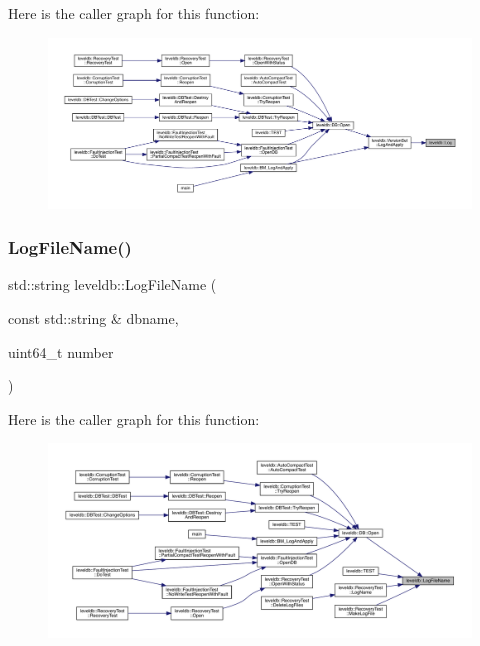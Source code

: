 Here is the caller graph for this function\+:
\nopagebreak
\begin{figure}[H]
\begin{center}
\leavevmode
\includegraphics[width=350pt]{namespaceleveldb_aeba9623ceee38be99bed2bc1ae082954_icgraph}
\end{center}
\end{figure}
\mbox{\label{namespaceleveldb_aba6dbc953c414e0069c35662ea806b9a}} 
\subsubsection{\texorpdfstring{LogFileName()}{LogFileName()}}
{\footnotesize\ttfamily std\+::string leveldb\+::\+Log\+File\+Name (\begin{DoxyParamCaption}\item[{const std\+::string \&}]{dbname,  }\item[{uint64\+\_\+t}]{number }\end{DoxyParamCaption})}

Here is the caller graph for this function\+:
\nopagebreak
\begin{figure}[H]
\begin{center}
\leavevmode
\includegraphics[width=350pt]{namespaceleveldb_aba6dbc953c414e0069c35662ea806b9a_icgraph}
\end{center}
\end{figure}
\mbox{\label{namespaceleveldb_a706c78e756ff2dcd2185cdf2265c0b8a}} 
